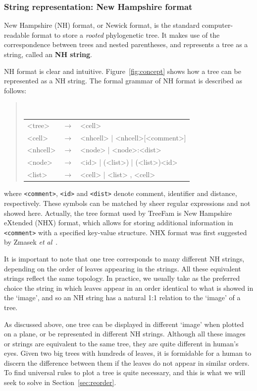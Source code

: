\subsubsection{String representation: New Hampshire format}\label{sec:nhformat}

New Hampshire (NH) format, or Newick format,
is the standard computer-readable
format to store a \emph{rooted} phylogenetic tree. It makes
use of the correspondence between trees and nested parentheses, and represents a tree
as a string, called an \textbf{NH string}.

NH format is clear and intuitive. Figure~\ref{fig:concept} shows how a tree can be represented
as a NH string. The formal grammar of NH format is described as follows:
\begin{quote}
{\tt
\begin{tabular}{lcl}
<tree>	&$\rightarrow$&<cell>\\
<cell>	&$\rightarrow$&<nhcell> | <nhcell>[<comment>]\\
<nhcell>&$\rightarrow$&<node> | <node>:<dist>\\
<node>	&$\rightarrow$&<id> | (<list>) | (<list>)<id>\\
<list>	&$\rightarrow$&<cell> | <list> , <cell>\\
\end{tabular}
}
\end{quote}
where {\tt<comment>}, {\tt<id>} and {\tt<dist>} denote comment, identifier and distance, respectively.
These symbols can be matched by sheer regular expressions and not showed here.
Actually, the tree format used by TreeFam is New Hampshire eXtended (NHX) format, which
allows for storing additional information in {\tt<comment>} with a specified key-value structure.
NHX format was first suggested by Zmasek {\it et al}~\cite{zmasek012}.

It is important to note that one tree corresponds to many different
NH strings, depending on the order of leaves appearing in the strings. All these
equivalent strings reflect the same topology. In practice, we usually
take as the preferred choice the string in which leaves appear in an order identical
to what is showed in the `image', and so an NH string has a natural 1:1 relation to
the `image' of a tree.

As discussed above, one tree can be displayed in different `image' when plotted on a plane,
or be represented in different NH strings. Although all these images or strings
are equivalent to the same tree, they are quite different in human's eyes. Given two big trees with
hundreds of leaves, it is formidable for a human to discern the difference between them if
the leaves do not appear in similar orders.
To find universal rules to plot a tree is quite necessary, and this is what we will seek
to solve in Section~\ref{sec:reorder}.

